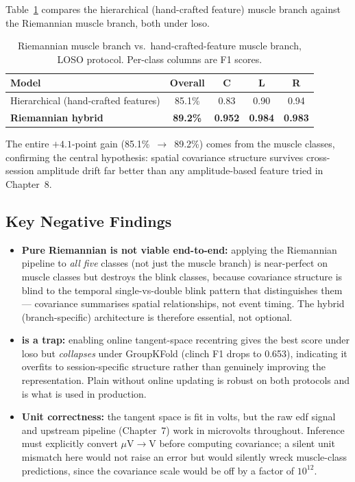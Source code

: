Table~\ref{tab:riemann_results} compares the hierarchical
(hand-crafted feature) muscle branch against the Riemannian muscle
branch, both under \acrshort{loso}.

\begin{table}[htbp]
\centering
\caption{Riemannian muscle branch vs.\ hand-crafted-feature muscle
branch, LOSO protocol. Per-class columns are F1 scores.}
\label{tab:riemann_results}
\renewcommand{\arraystretch}{1.3}
\begin{tabular}{l c c c c}
\toprule
\textbf{Model} & \textbf{Overall} & \textbf{C} & \textbf{L} &
\textbf{R} \\
\midrule
Hierarchical (hand-crafted features) & 85.1\% & 0.83 & 0.90 & 0.94 \\
\textbf{Riemannian hybrid} & \textbf{89.2\%} & \textbf{0.952} &
\textbf{0.984} & \textbf{0.983} \\
\bottomrule
\end{tabular}
\end{table}

The entire $+4.1$-point gain (85.1\%~$\rightarrow$~89.2\%) comes
from the muscle classes, confirming the central hypothesis: spatial
covariance structure survives cross-session amplitude drift far
better than any amplitude-based feature tried in Chapter~8.

\subsection{Key Negative Findings}

\begin{itemize}[leftmargin=*]
    \item \textbf{Pure Riemannian is not viable end-to-end:}
    applying the Riemannian pipeline to \emph{all five} classes
    (not just the muscle branch) is near-perfect on muscle classes
    but destroys the blink classes, because covariance structure is
    blind to the temporal single-vs-double blink pattern that
    distinguishes them --- covariance summarises spatial
    relationships, not event timing. The hybrid (branch-specific)
    architecture is therefore essential, not optional.
    \item \textbf{ is a trap:} enabling online
    tangent-space recentring gives the best score under
    \acrshort{loso} but \emph{collapses} under GroupKFold (clinch
    F1 drops to 0.653), indicating it overfits to session-specific
    structure rather than genuinely improving the representation.
    Plain  without online updating is robust on
    both protocols and is what is used in production.
    \item \textbf{Unit correctness:} the tangent space is fit in
    volts, but the raw \acrshort{edf} signal and upstream pipeline
    (Chapter~7) work in microvolts throughout. Inference must
    explicitly convert $\mu\text{V} \rightarrow \text{V}$ before
    computing covariance; a silent unit mismatch here would not
    raise an error but would silently wreck muscle-class
    predictions, since the covariance scale would be off by a
    factor of $10^{12}$.
\end{itemize}

